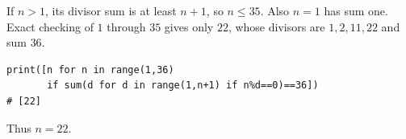 If $n>1$, its divisor sum is at least $n+1$, so $n\le35$. Also $n=1$ has sum one. Exact checking of $1$ through $35$ gives only $22$, whose divisors are $1,2,11,22$ and sum $36$.
\begin{verbatim}
print([n for n in range(1,36)
       if sum(d for d in range(1,n+1) if n%d==0)==36])
# [22]
\end{verbatim}
Thus $\boxed{n=22}$.
